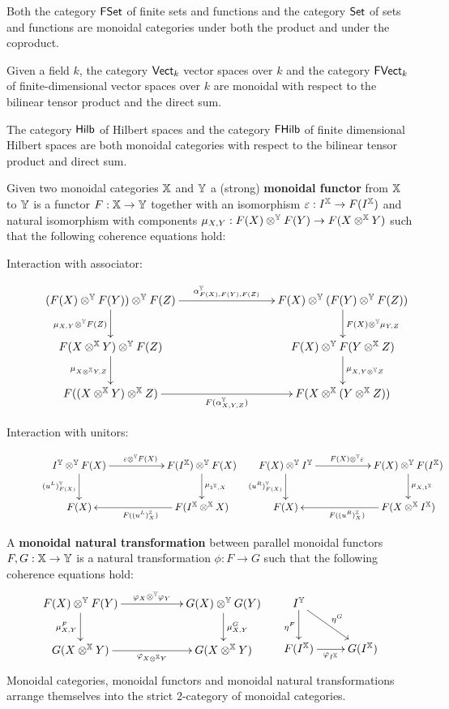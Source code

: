 \begin{example}
Both the category $\mathsf{FSet}$ of finite sets and functions and the category $\mathsf{Set}$ of sets and functions are monoidal categories under both the product and under the coproduct.

Given a field $k$, the category $\mathsf{Vect}_k$ vector spaces over $k$  and the category $\mathsf{FVect}_k$ of finite-dimensional vector spaces over $k$ are monoidal with respect to the bilinear tensor product and the direct sum.

The category $\mathsf{Hilb}$ of Hilbert spaces and the category $\mathsf{FHilb}$ of finite dimensional Hilbert spaces are both monoidal categories with respect to the bilinear tensor product and direct sum.
\end{example}
\begin{definition}
Given two monoidal categories $\mathbb{X}$ and $\mathbb{Y}$ a (strong) {\bf monoidal functor} from $\mathbb{X}$ to $\mathbb{Y}$ is a functor $F:\mathbb{X}\to \mathbb{Y}$ together with an isomorphism $\varepsilon:I^{\mathbb{X}} \to F(I^{\mathbb{X}})$ and natural isomorphism with components $\mu_{X,Y}:F(X)\otimes^{\mathbb{Y}} F(Y) \to F(X \otimes^{\mathbb{X}} Y)$ such that the following coherence equations hold:
\begin{description}
\item[Interaction with associator:]
$$
\xymatrix{
 (F(X)\otimes^\Y F(Y))\otimes^\Y F(Z) \ar[rrr]^{\alpha_{F(X),F(Y),F(Z)}^{\Y}} \ar[d]_{\mu_{X,Y}\otimes^\Y F(Z)}
   &&& F(X) \otimes^\Y (F(Y)\otimes^\Y F(Z)) \ar[d]^{F(X)\otimes^\Y \mu_{Y,Z}}
 \\F(X\otimes^\X Y)\otimes^\Y F(Z) \ar[d]_{\mu_{X\otimes^\X Y,Z}}
   &&& F(X)\otimes^\Y F(Y\otimes^\X Z) \ar[d]^{\mu_{X,Y\otimes^\Y Z}}
 \\ F((X\otimes^\X Y) \otimes^\X Z) \ar[rrr]_{F(\alpha_{X,Y,Z}^\Y)}
   &&& F(X\otimes^\X (Y\otimes^\X Z))
}
$$
\item[Interaction with unitors:]
$$
\xymatrix{
 I^\Y \otimes^\Y F(X) \ar[rr]^{\epsilon \otimes^\Y F(X)} \ar[d]_{(u^L)^\Y_{F(X)}}
  &&  F(I^\X) \otimes^\Y F(X) \ar[d]^{\mu_{1^\X,X}}
\\F(X)
 & & F(I^\X\otimes^\X X) \ar[ll]^{F((u^L)^\X_{X} )}
} \hspace*{.2cm}
\xymatrix{
  F(X)  \otimes^\Y I^\Y \ar[rr]^{ F(X)  \otimes^\Y \epsilon} \ar[d]_{(u^R)^\Y_{F(X)}}
  && F(X) \otimes^\Y    F(I^\X)  \ar[d]^{\mu_{X,1^\X}}
\\F(X)
 & & F(X \otimes^\X I^\X ) \ar[ll]^{F((u^R)^\X_{X} )}
}
$$
\end{description}
A {\bf monoidal natural transformation} between parallel monoidal functors $F,G:\mathbb{X}\to \mathbb{Y}$ is a natural transformation $\phi:F\to G$ such that the following coherence equations hold:
$$
\xymatrix{
  F(X)\otimes^\Y F(Y) \ar[rr]^{\phi_X\otimes^\Y \phi_Y} \ar[d]_{\mu^F_{X,Y}}
   && G(X)\otimes^\Y G(Y) \ar[d]^{\mu^G_{X,Y}}
 \\G(X\otimes^\X Y) \ar[rr]_{\phi_{X\otimes^\X Y}}
   && G(X\otimes^\X Y)
}
\hspace*{.5cm}
\xymatrix{
I^\Y \ar[dr]^{\eta^G} \ar[d]_{\eta^F}
\\ F(I^\X) \ar[r]_{\phi_{I^\X}}
  &G(I^\X)
}
$$
Monoidal categories, monoidal functors and monoidal natural transformations arrange themselves into the strict 2-category of monoidal categories. 
\end{definition}
